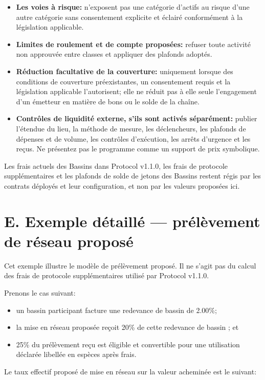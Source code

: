 \documentclass[11pt]{article}
\begin{document}
\begin{itemize}[leftmargin=*]
\item \textbf{Les voies à risque:} n'exposent pas une catégorie d'actifs au risque d'une autre catégorie sans consentement explicite et éclairé conformément à la législation applicable.
\item \textbf{Limites de roulement et de compte proposées:} refuser toute activité non approuvée entre classes et appliquer des plafonds adoptés.
\item \textbf{Réduction facultative de la couverture:} uniquement lorsque des conditions de couverture préexistantes, un consentement requis et la législation applicable l'autorisent; elle ne réduit pas à elle seule l'engagement d'un émetteur en matière de bons ou le solde de la chaîne.
\item \textbf{Contrôles de liquidité externe, s'ils sont activés séparément:} publier l'étendue du lieu, la méthode de mesure, les déclencheurs, les plafonds de dépenses et de volume, les contrôles d'exécution, les arrêts d'urgence et les reçus. Ne présentez pas le programme comme un support de prix symbolique.
\end{itemize}
Les frais actuels des Bassins dans Protocol v1.1.0, les frais de protocole supplémentaires et les plafonds de solde de jetons des Bassins restent régis par les contrats déployés et leur configuration, et non par les valeurs proposées ici.


\section*{E. Exemple détaillé --- prélèvement de réseau proposé}

Cet exemple illustre le modèle de prélèvement proposé. Il ne s'agit pas du calcul des frais de protocole supplémentaires utilisé par Protocol v1.1.0.

Prenons le cas suivant:

\begin{itemize}[leftmargin=*]
\item un bassin participant facture une redevance de bassin de 2.00\%;
\item la mise en réseau proposée reçoit 20\% de cette redevance de bassin ; et
\item 25\% du prélèvement reçu est éligible et convertible pour une utilisation déclarée libellée en espèces après frais.
\end{itemize}
Le taux effectif proposé de mise en réseau sur la valeur acheminée est le suivant:
\end{document}
